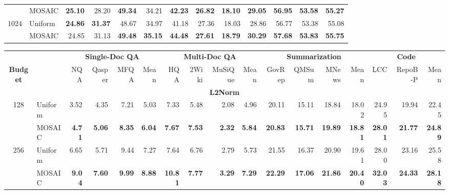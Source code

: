 \begin{table}[tp]
\begin{tabular}{@{} c l rrrr rrrr rrr @{}}
     & MOSAIC & \textbf{25.10} & 28.20 & \textbf{49.34} & 34.21 & \textbf{42.23} & \textbf{26.82} & \textbf{18.10} & \textbf{29.05} & \textbf{56.95} & \textbf{53.58} & \textbf{55.27} \\
    \cmidrule(l){1-13}
    \multirow{2}{*}{1024} & Uniform & \textbf{24.86} & \textbf{31.37} & 48.67 & 34.97 & 41.18 & 27.36 & 18.03 & 28.86 & 56.77 & 53.38 & 55.08 \\
     & MOSAIC & 24.85 & 31.13 & \textbf{49.48} & \textbf{35.15} & \textbf{44.48} & \textbf{27.61} & \textbf{18.79} & \textbf{30.29} & \textbf{57.68} & \textbf{53.83} & \textbf{55.75} \\
    \bottomrule
  \end{tabular}

  \vspace{8pt}
  \scriptsize
  \setlength{\tabcolsep}{3pt}
  \renewcommand{\arraystretch}{0.92}
  \begin{tabular}{@{} c l rrrr rrrr rrrr rrr @{}}
    \toprule
    & & \multicolumn{4}{c}{\textbf{Single-Doc QA}} & \multicolumn{4}{c}{\textbf{Multi-Doc QA}} & \multicolumn{4}{c}{\textbf{Summarization}} & \multicolumn{3}{c}{\textbf{Code}} \\
    \cmidrule(lr){3-6} \cmidrule(lr){7-10} \cmidrule(lr){11-14} \cmidrule(lr){15-17}
    \textbf{Budget} & & NQA & Qasper & MFQA & Mean & HQA & 2Wiki & MuSiQue & Mean & GovRep & QMSum & MNews & Mean & LCC & RepoB-P & Mean \\
    \midrule
    \multicolumn{17}{c}{\textbf{L2Norm}} \\
    \midrule
    \multirow{2}{*}{128} & Uniform & 3.52 & 4.35 & 7.21 & 5.03 & 7.33 & 5.48 & 2.08 & 4.96 & 20.11 & 15.11 & 18.84 & 18.02 & 24.95 & 19.94 & 22.45 \\
     & MOSAIC & \textbf{4.71} & \textbf{5.06} & \textbf{8.35} & \textbf{6.04} & \textbf{7.67} & \textbf{7.53} & \textbf{2.32} & \textbf{5.84} & \textbf{20.83} & \textbf{15.71} & \textbf{19.89} & \textbf{18.81} & \textbf{28.01} & \textbf{21.77} & \textbf{24.89} \\
    \cmidrule(l){1-17}
    \multirow{2}{*}{256} & Uniform & 6.65 & 5.71 & 9.44 & 7.27 & 7.64 & 6.76 & 2.79 & 5.73 & 21.55 & 16.37 & 20.90 & 19.61 & 28.00 & 23.16 & 25.58 \\
     & MOSAIC & \textbf{9.04} & \textbf{7.60} & \textbf{9.99} & \textbf{8.88} & \textbf{10.81} & \textbf{7.77} & \textbf{3.29} & \textbf{7.29} & \textbf{22.29} & \textbf{17.06} & \textbf{21.86} & \textbf{20.40} & \textbf{32.03} & \textbf{24.33} & \textbf{28.18} \\

\end{tabular}
\end{table}

